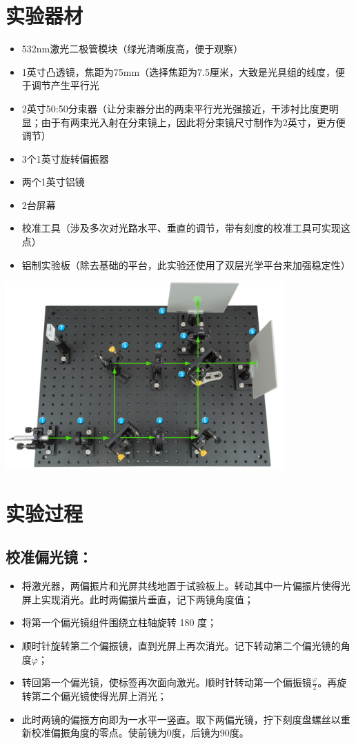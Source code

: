 \documentclass[10pt]{ctexart}
\begin{document}
\section{实验器材}
\begin{itemize}
    \item 532nm激光二极管模块（绿光清晰度高，便于观察）
    \item 1英寸凸透镜，焦距为75mm（选择焦距为7.5厘米，大致是光具组的线度，便于调节产生平行光
    \item 2英寸50:50分束器（让分束器分出的两束平行光光强接近，干涉衬比度更明显；由于有两束光入射在分束镜上，因此将分束镜尺寸制作为2英寸，更方便调节）
    \item 3个1英寸旋转偏振器
    \item 两个1英寸铝镜
    \item 2台屏幕
    \item 校准工具（涉及多次对光路水平、垂直的调节，带有刻度的校准工具可实现这点）
    \item 铝制实验板（除去基础的平台，此实验还使用了双层光学平台来加强稳定性）
\end{itemize}
\begin{minipage}{\textwidth} 
    \includegraphics[width=0.8\textwidth]{干涉仪光路图.png}
\end{minipage}
\newpage
\section{实验过程}
\subsection{校准偏光镜：}
\begin{itemize}
\item 将激光器，两偏振片和光屏共线地置于试验板上。转动其中一片偏振片使得光屏上实现消光。此时两偏振片垂直，记下两镜角度值；
\item 将第一个偏光镜组件围绕立柱轴旋转 180 度；
\item 顺时针旋转第二个偏振镜，直到光屏上再次消光。记下转动第二个偏光镜的角度$\varphi$；
\item 转回第一个偏光镜，使标签再次面向激光。顺时针转动第一个偏振镜$\frac{\varphi}{2}$。再旋转第二个偏光镜使得光屏上消光；
\item 此时两镜的偏振方向即为一水平一竖直。取下两偏光镜，拧下刻度盘螺丝以重新校准偏振角度的零点。使前镜为0度，后镜为90度。
\end{itemize}
\end{document}
